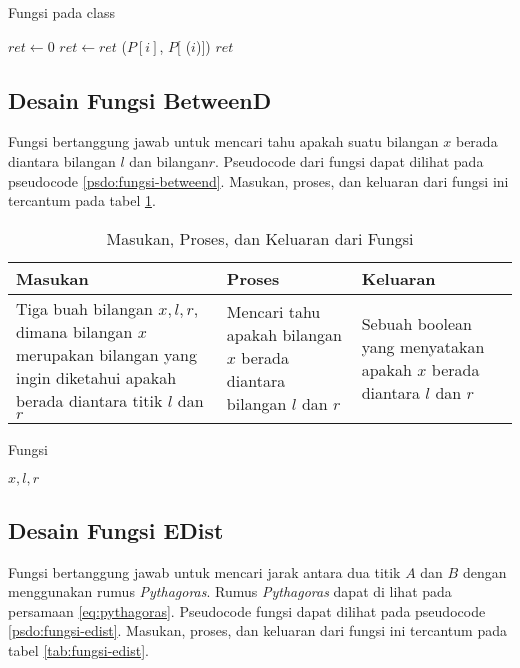 \begin{algorithm}
    \caption{Fungsi  pada class }
	\label{psdo:class-polygon-perimeter}
    \begin{algorithmic}[1]
        \State $ret \leftarrow 0$
            \State $ret \leftarrow ret $ ($P[i]$, $P[$ ($i$)$] $)
        \EndFor
        \State \Return $ret$
	\end{algorithmic}
\end{algorithm}

\subsection{ Desain Fungsi BetweenD}
\label{sec:fungsi-betweend}
Fungsi  bertanggung jawab untuk mencari tahu apakah suatu bilangan $x$ berada diantara bilangan $l$ dan bilangan$r$. Pseudocode dari fungsi  dapat dilihat pada pseudocode \ref{psdo:fungsi-betweend}. Masukan, proses, dan keluaran dari fungsi ini tercantum pada tabel \ref{tab:fungsi-betweend}.

\begin{table}[htb]
	\Centering
	\caption{Masukan, Proses, dan Keluaran dari Fungsi  }
	\begin{tabular}{|p{3cm}|p{3cm}|p{3cm}|}
	\hline
	Masukan   & Proses     & Keluaran \\ \hline
	Tiga buah bilangan $x,l,r$, dimana bilangan $x$ merupakan bilangan yang ingin diketahui apakah berada diantara titik $l$ dan $r$ & Mencari tahu apakah bilangan $x$ berada diantara bilangan $l$ dan $r$ &   Sebuah boolean yang menyatakan apakah $x$ berada diantara $l$ dan $r$     \\ \hline
	\end{tabular}
	\label{tab:fungsi-betweend}
\end{table}
\begin{algorithm}
    \caption{Fungsi }
	\label{psdo:fungsi-betweend}
    \begin{algorithmic}[1]
        \Require $x, l, r$
            \State \Return {}
        \Else
            \State \Return {}
        \EndIf
	\end{algorithmic}
\end{algorithm}


\subsection{ Desain Fungsi EDist}
\label{sec:fungsi-edist}
Fungsi  bertanggung jawab untuk mencari jarak antara dua titik  $A$ dan  $B$ dengan menggunakan rumus \textit{Pythagoras}. Rumus \textit{Pythagoras} dapat di lihat pada persamaan \ref{eq:pythagoras}. Pseudocode fungsi  dapat dilihat pada pseudocode \ref{psdo:fungsi-edist}. Masukan, proses, dan keluaran dari fungsi ini tercantum pada tabel \ref{tab:fungsi-edist}.

